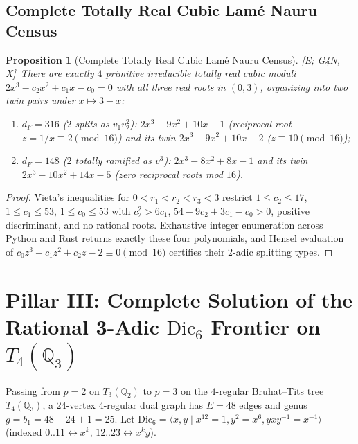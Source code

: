 \documentclass[11pt]{amsart}
\numberwithin{equation}{section}
\theoremstyle{plain}
\newtheorem{proposition}[theorem]{Proposition}
\theoremstyle{definition}\newtheorem{definition}[theorem]{Definition}
\theoremstyle{remark}\newtheorem{remark}[theorem]{Remark}
\newcommand{\Q}{\mathbb{Q}}
\newcommand{\Dic}{\mathrm{Dic}}
\newcommand{\ctag}[1]{\textup{\textsf{\scriptsize[#1]}}}
\begin{document}
\subsection{Complete Totally Real Cubic Lam\'e Nauru Census}\label{sec:cubic_census}
\begin{proposition}[Complete Totally Real Cubic Lam\'e Nauru Census]\label{prop:cubic_census}
\ctag{E; G4N, X}\ There are exactly $4$ primitive irreducible totally real cubic moduli $2x^3 - c_2 x^2 + c_1 x - c_0 = 0$ with all three real roots in $(0,3)$, organizing into two twin pairs under $x\mapsto 3-x$:
\begin{enumerate}[label=(\arabic*),nosep]
\item $d_F = 316$ ($2$ splits as $v_1 v_2^2$): $2x^3 - 9x^2 + 10x - 1$ (reciprocal root $z = 1/x \equiv 2\pmod{16}$) and its twin $2x^3 - 9x^2 + 10x - 2$ ($z \equiv 10\pmod{16}$);
\item $d_F = 148$ ($2$ totally ramified as $v^3$): $2x^3 - 8x^2 + 8x - 1$ and its twin $2x^3 - 10x^2 + 14x - 5$ (zero reciprocal roots mod $16$).
\end{enumerate}
\end{proposition}
\begin{proof}
Vieta's inequalities for $0<r_1<r_2<r_3<3$ restrict $1\le c_2\le 17$, $1\le c_1\le 53$, $1\le c_0\le 53$ with $c_2^2 > 6c_1$, $54 - 9c_2 + 3c_1 - c_0 > 0$, positive discriminant, and no rational roots. Exhaustive integer enumeration across Python and Rust returns exactly these four polynomials, and Hensel evaluation of $c_0 z^3 - c_1 z^2 + c_2 z - 2 \equiv 0 \pmod{16}$ certifies their $2$-adic splitting types.
\end{proof}

\section{Pillar III: Complete Solution of the Rational 3-Adic \texorpdfstring{$\Dic_6$}{Dic6} Frontier on \texorpdfstring{$T_4(\Q_3)$}{T4(Q3)}}\label{sec:pillar3}
Passing from $p=2$ on $T_3(\Q_2)$ to $p=3$ on the $4$-regular Bruhat--Tits tree $T_4(\Q_3)$, a $24$-vertex $4$-regular dual graph has $E=48$ edges and genus $g = b_1 = 48 - 24 + 1 = 25$. Let $\Dic_6 = \langle x, y \mid x^{12}=1, y^2=x^6, yxy^{-1}=x^{-1}\rangle$ (indexed $0..11\leftrightarrow x^k$, $12..23\leftrightarrow x^k y$).
\end{document}
